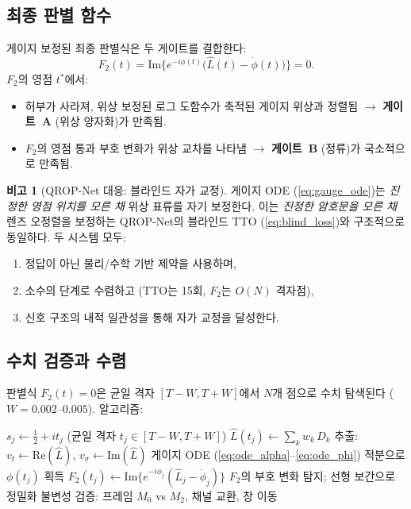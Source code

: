 \documentclass[11pt, a4paper]{article}
\theoremstyle{definition}
\newtheorem{remark}{비고}[section]
\theoremstyle{plain}
\newcommand{\Lhat}{\hat{L}}
\begin{document}
\subsection{최종 판별 함수}
\label{sec:discriminant}

게이지 보정된 최종 판별식은 두 게이트를 결합한다:
\begin{equation}
\boxed{
  F_2(t) = \mathrm{Im}\!\Big\{
    e^{-i\phi(t)}\Big(\Lhat(t) - \dot{\phi}(t)\Big)
  \Big\} = 0.
}
\label{eq:F2}
\end{equation}
$F_2$의 영점 $t^*$에서:
\begin{itemize}
  \item 허부가 사라져, 위상 보정된 로그 도함수가 축적된 게이지 위상과 정렬됨 $\to$ \textbf{게이트~A} (위상 양자화)가 만족됨.
  \item $F_2$의 영점 통과 부호 변화가 위상 교차를 나타냄 $\to$ \textbf{게이트~B} (정류)가 국소적으로 만족됨.
\end{itemize}

\begin{remark}[QROP-Net 대응: 블라인드 자가 교정]
\label{rem:tto_parallel}
게이지 ODE (\cref{eq:gauge_ode})는 \textit{진정한 영점 위치를 모른 채} 위상 표류를 자기 보정한다. 이는 \textit{진정한 암호문을 모른 채} 렌즈 오정렬을 보정하는 QROP-Net의 블라인드 TTO (\cref{eq:blind_loss})와 구조적으로 동일하다. 두 시스템 모두:
\begin{enumerate}
  \item 정답이 아닌 물리/수학 기반 제약을 사용하며,
  \item 소수의 단계로 수렴하고 (TTO는 15회, $F_2$는 $O(N)$ 격자점),
  \item 신호 구조의 내적 일관성을 통해 자가 교정을 달성한다.
\end{enumerate}
\end{remark}


\subsection{수치 검증과 수렴}
\label{sec:polyadic_results}

판별식 $F_2(t) = 0$은 균일 격자 $[T-W, T+W]$에서 $N$개 점으로 수치 탐색된다 ($W = 0.002$--$0.005$). 알고리즘:

\begin{algorithm}[ht]
\DontPrintSemicolon
\caption{다원적 영점 탐지}
\label{alg:polyadic}
$s_j \gets \tfrac{1}{2} + it_j$ (균일 격자 $t_j \in [T-W, T+W]$)\;
$\Lhat(t_j) \gets \sum_k w_k\,D_k$\;
추출: $v_t \gets \mathrm{Re}(\Lhat)$,
$v_\sigma \gets \mathrm{Im}(\Lhat)$\;
게이지 ODE (\cref{eq:ode_alpha}--\ref{eq:ode_phi}) 적분으로 $\phi(t_j)$ 획득\;
$F_2(t_j) \gets \mathrm{Im}\{e^{-i\phi_j}(\Lhat_j - \dot{\phi}_j)\}$\;
$F_2$의 부호 변화 탐지; 선형 보간으로 정밀화\;
불변성 검증: 프레임 $M_0$ vs $M_2$, 채널 교환, 창 이동\;
\end{algorithm}
\end{document}
